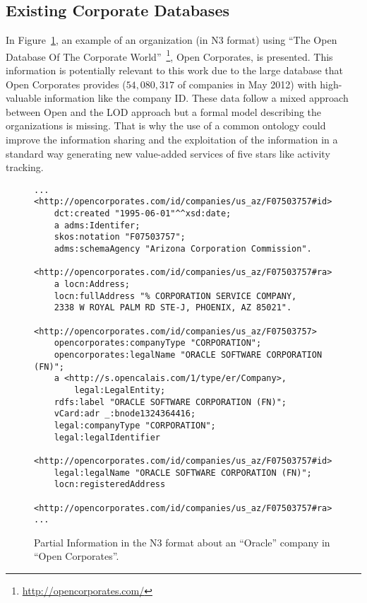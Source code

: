 \documentclass{llncs}
\begin{document}
\subsection{Existing Corporate Databases}
In Figure~\ref{figure:open}, an example of an organization (in N3 format) using ``The Open Database Of The Corporate World''~\footnote{\url{http://opencorporates.com/}}, 
Open Corporates, is presented. This information is potentially relevant to this work due to the large database 
that Open Corporates provides ($54,080,317$ of companies in May 2012) with high-valuable information like the company ID. 
These data follow a mixed approach between Open and the LOD approach but a formal model describing the organizations is missing. 
That is why the use of a common ontology could improve the information sharing and the exploitation of the information in a standard way generating new value-added services 
of five stars like activity tracking. 
% 
\begin{figure}[!h]
\begin{center}
\begin{lstlisting}[language=SPARQL]
...
<http://opencorporates.com/id/companies/us_az/F07503757#id> 
	dct:created "1995-06-01"^^xsd:date;
	a adms:Identifer;
	skos:notation "F07503757";
	adms:schemaAgency "Arizona Corporation Commission".

<http://opencorporates.com/id/companies/us_az/F07503757#ra> 
	a locn:Address;
	locn:fullAddress "% CORPORATION SERVICE COMPANY, 
	2338 W ROYAL PALM RD STE-J, PHOENIX, AZ 85021".

<http://opencorporates.com/id/companies/us_az/F07503757> 
	opencorporates:companyType "CORPORATION";
	opencorporates:legalName "ORACLE SOFTWARE CORPORATION (FN)";
	a <http://s.opencalais.com/1/type/er/Company>,
		legal:LegalEntity;
	rdfs:label "ORACLE SOFTWARE CORPORATION (FN)";
	vCard:adr _:bnode1324364416;
	legal:companyType "CORPORATION";
	legal:legalIdentifier 
	  <http://opencorporates.com/id/companies/us_az/F07503757#id>;
	legal:legalName "ORACLE SOFTWARE CORPORATION (FN)";
	locn:registeredAddress 
	  <http://opencorporates.com/id/companies/us_az/F07503757#ra>.
...
\end{lstlisting}
\caption{Partial Information in the N3 format about an ``Oracle'' company in ``Open Corporates''.}
\label{figure:open}
\end{center}
\end{figure}


\end{document}
